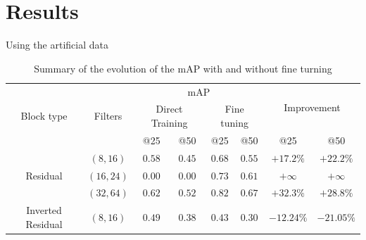 \documentclass{beamer}
\begin{document}
\section{Results}
\begin{frame}{Using the artificial data}
    \begin{table}[]
    \centering
    \tiny
    \begin{tabular}{|c|c|c|c|c|c|c|c|}
        \hline
        \multirow{3}{*}{Block type} & \multirow{3}{*}{Filters} & \multicolumn{4}{|c|}{mAP} & \multicolumn{2}{|c|}{\multirow{2}{*}{Improvement}} \\
        & & \multicolumn{2}{|c|}{Direct Training} & \multicolumn{2}{|c|}{Fine tuning} & \multicolumn{2}{|c|}{}\\ 
        & & @25 & @50 & @25 & @50 & @25 & @50 \\ \hline
        \multirow{3}{*}{Residual} & $(8,16)$   & $0.58$ & $0.45$ & $0.68$ & $0.55$ & $+17.2\%$ &                               $+22.2\%$ \\
                                  & $(16,24)$ & $0.00$ & $0.00$ & $0.73$ & $0.61$ & $+\infty$ & $+\infty$ \\
                                  & $(32,64)$ & $0.62$ & $0.52$ & $0.82$ & $0.67$ & $+32.3\%$ & $+28.8\%$ \\ \hline
        Inverted Residual         & $(8,16)$   & $0.49$ & $0.38$ & $0.43$ & $0.30$ & $-12.24\%$ &                               $-21.05\%$\\ \hline
    \end{tabular}
    \caption{Summary of the evolution of the mAP with and without fine turning}
    \label{tab:mapFineTuning}
\end{table}
\end{frame}{}
\end{document}
